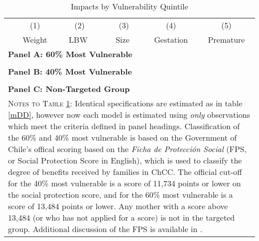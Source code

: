 \documentclass[12pt]{article}
\begin{document}
\begin{spacing}{1.4}
\begin{table}[htpb!]
  \begin{center}
    \caption{Impacts by Vulnerability Quintile}
    \label{tab:FPS}
    \begin{tabular}{lccccc} \toprule
      &(1)&(2)&(3)&(4)&(5)\\
      & Weight &\ \ LBW \ \ &\ \  Size \  \ & Gestation & Premature \\ \midrule
      \multicolumn{6}{l}{\textbf{Panel A: 60\% Most Vulnerable}} \\
      
      \\
      \multicolumn{6}{l}{\textbf{Panel B: 40\% Most Vulnerable}} \\
      
      \\
      \multicolumn{6}{l}{\textbf{Panel C: Non-Targeted Group}} \\
      
      \bottomrule
      \multicolumn{6}{p{15.8cm}}{{\footnotesize \textsc{Notes to Table \ref{tab:FPS}}:
          Identical specifications are estimated as in table \ref{mDD}, however now each
          model is estimated using \emph{only} observations which meet the criteria
          defined in panel headings. Classification of the 60\% and 40\% most vulnerable
          is based on the Government of Chile's offical scoring based on the
          \emph{Ficha de Protecci\'on Social} (FPS, or Social Protection Score in English),
          which is used to classify the degree of benefits received by families in ChCC.
          The official cut-off for the 40\% most vulnerable is a score of 11,734 points or
          lower on the social protection score, and for the 60\% most vulnerable is a score
          of 13,484 points or lower.  Any mother with a score above 13,484 (or who has not
          applied for a score) is not in the targeted group. Additional discussion of the
          FPS is available in \citet{Herreraetal2010}.}} \\
    \end{tabular}
  \end{center}
\end{table}


\end{spacing}
\end{document}
